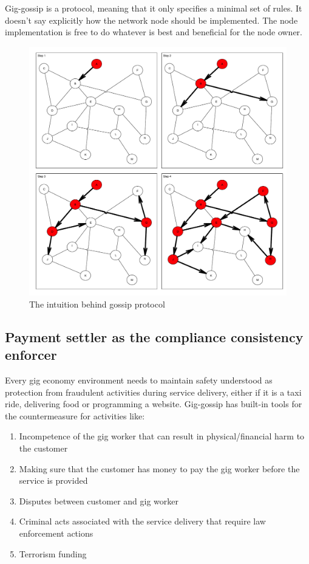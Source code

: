 \documentclass{article}
\begin{document}
Gig-gossip is a protocol, meaning that it only specifies a minimal set of rules. It doesn't say explicitly how the network node should be implemented. The node implementation is free to do whatever is best and beneficial for the node owner.

\begin{figure}
	\centering
	\includegraphics[scale=0.4]{network.pdf}
	\caption{The intuition behind gossip protocol}
	\label{fig:network}
\end{figure}

\subsection{Payment settler as the compliance consistency enforcer}
Every gig economy environment needs to maintain safety understood as protection from fraudulent activities during service delivery, either if it is a taxi ride, delivering food or programming a website. Gig-gossip has built-in tools for the countermeasure for activities like:
\begin{enumerate}
	\item Incompetence of the gig worker that can result in physical/financial harm to the customer
	\item Making sure that the customer has money to pay the gig worker before the service is provided
	\item Disputes between customer and gig worker
	\item Criminal acts associated with the service delivery that require law enforcement actions
	\item Terrorism funding
\end{enumerate}
\end{document}
